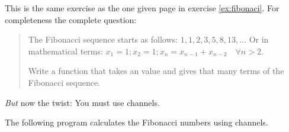 \begin{Exercise}[title={Fibonacci II},difficulty=7]
\label{ex:fibonaci II}
\Question\label{ex:fibonaci II q1}
This is the same exercise as the one given page \pageref{ex:fibonaci} 
in exercise \ref{ex:fibonaci}. For completeness the complete question:

\begin{quote}
The Fibonacci sequence starts as follows: $1, 1, 2, 3, 5, 8, 13, \ldots$
Or in mathematical terms: $ x_1 = 1; x_2 = 1; x_n = x_{n-1} +
x_{n-2}\quad\forall n > 2 $.

Write a function that takes an  value and gives 
that many terms of the Fibonacci sequence.
\end{quote}
\emph{But} now the twist: You must use channels.

\end{Exercise}

\begin{Answer}
\Question
The following program calculates the Fibonacci numbers using channels.

\end{Answer}


